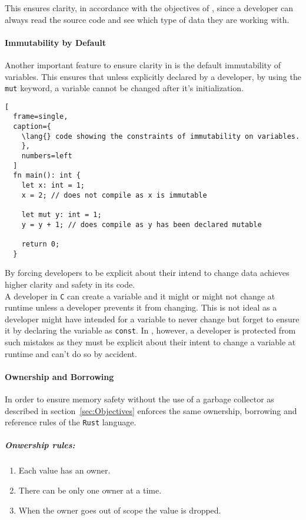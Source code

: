 This ensures clarity, in accordance with the objectives of \lang{}, since a
developer can always read the source code and see which type of data they are working
with.

\paragraph{Immutability by Default} \hfill 
\vspace{0.1em}

Another important feature to ensure clarity in \lang{} is the default immutability of
variables. This ensures that unless explicitly declared by a developer, by using the
\texttt{mut} keyword, a variable
cannot be changed after it's initialization.

\begin{lstlisting}[
  frame=single,
  caption={
    \lang{} code showing the constraints of immutability on variables.
    }, 
    numbers=left
  ]
  fn main(): int {
    let x: int = 1; 
    x = 2; // does not compile as x is immutable

    let mut y: int = 1; 
    y = y + 1; // does compile as y has been declared mutable

    return 0;
  }
\end{lstlisting}

By forcing developers to be explicit about their intend to change data \lang{}
achieves higher clarity and safety in its code. \\ 

A developer in \texttt{C} can create a variable and it might or might not change at
runtime unless a developer prevents it from changing. This is not ideal as a
developer might have intended for a variable to never change but forget to ensure it
by declaring the variable as \texttt{const}. In \lang, however, a developer is protected from
such mistakes as they must be explicit about their intent to change a variable at
runtime and can't do so by accident.

\paragraph{Ownership and Borrowing} \hfill 
\label{par:Ownership}

In order to ensure memory safety without the use of a garbage collector as described
in section~\ref{sec:Objectives} \lang{} enforces the same ownership, borrowing and
reference rules of the \texttt{Rust} language.

\subparagraph{Onwership rules:}
\begin{enumerate}
  \item Each value has an owner\cite{RUST}. 
  \item There can be only one owner at a time\cite{RUST}. 
  \item When the owner goes out of scope the value is dropped\cite{RUST}.
\end{enumerate}

